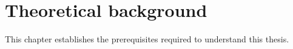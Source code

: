 \section{Theoretical background}

This chapter establishes the prerequisites required to understand this thesis.



